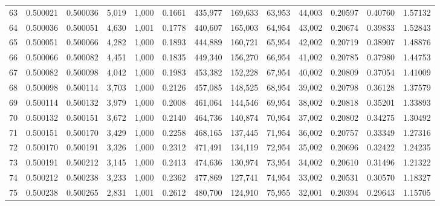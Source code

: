 \begin{tabular}{rrrrrrrrrrrrr}
63  &  0.500021 &  0.500036 &  5,019 &  1,000 &                                     0.1661 &  435,977 &  169,633 &   63,953 &   44,003 &  0.20597 &  0.40760 &  1.57132 \\
64  &  0.500036 &  0.500051 &  4,630 &  1,001 &                                     0.1778 &  440,607 &  165,003 &   64,954 &   43,002 &  0.20674 &  0.39833 &  1.52843 \\
65  &  0.500051 &  0.500066 &  4,282 &  1,000 &                                     0.1893 &  444,889 &  160,721 &   65,954 &   42,002 &  0.20719 &  0.38907 &  1.48876 \\
66  &  0.500066 &  0.500082 &  4,451 &  1,000 &                                     0.1835 &  449,340 &  156,270 &   66,954 &   41,002 &  0.20785 &  0.37980 &  1.44753 \\
67  &  0.500082 &  0.500098 &  4,042 &  1,000 &                                     0.1983 &  453,382 &  152,228 &   67,954 &   40,002 &  0.20809 &  0.37054 &  1.41009 \\
68  &  0.500098 &  0.500114 &  3,703 &  1,000 &                                     0.2126 &  457,085 &  148,525 &   68,954 &   39,002 &  0.20798 &  0.36128 &  1.37579 \\
69  &  0.500114 &  0.500132 &  3,979 &  1,000 &                                     0.2008 &  461,064 &  144,546 &   69,954 &   38,002 &  0.20818 &  0.35201 &  1.33893 \\
70  &  0.500132 &  0.500151 &  3,672 &  1,000 &                                     0.2140 &  464,736 &  140,874 &   70,954 &   37,002 &  0.20802 &  0.34275 &  1.30492 \\
71  &  0.500151 &  0.500170 &  3,429 &  1,000 &                                     0.2258 &  468,165 &  137,445 &   71,954 &   36,002 &  0.20757 &  0.33349 &  1.27316 \\
72  &  0.500170 &  0.500191 &  3,326 &  1,000 &                                     0.2312 &  471,491 &  134,119 &   72,954 &   35,002 &  0.20696 &  0.32422 &  1.24235 \\
73  &  0.500191 &  0.500212 &  3,145 &  1,000 &                                     0.2413 &  474,636 &  130,974 &   73,954 &   34,002 &  0.20610 &  0.31496 &  1.21322 \\
74  &  0.500212 &  0.500238 &  3,233 &  1,000 &                                     0.2362 &  477,869 &  127,741 &   74,954 &   33,002 &  0.20531 &  0.30570 &  1.18327 \\
75  &  0.500238 &  0.500265 &  2,831 &  1,001 &                                     0.2612 &  480,700 &  124,910 &   75,955 &   32,001 &  0.20394 &  0.29643 &  1.15705 \\

\end{tabular}
